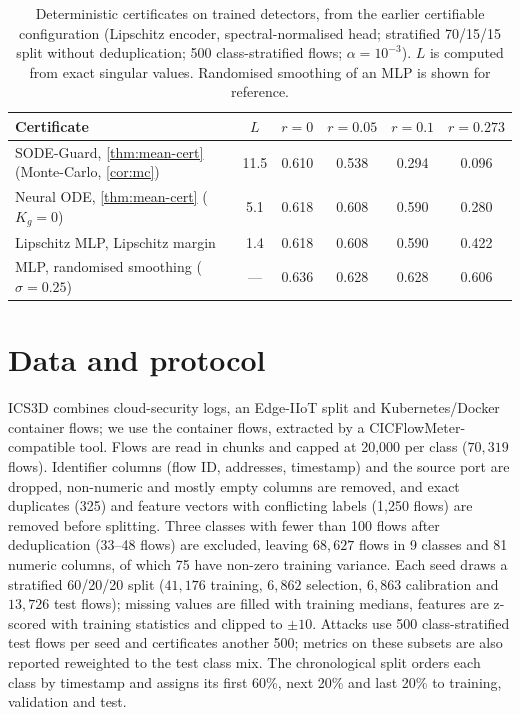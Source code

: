 \begin{table}[t]
\caption{Deterministic certificates on trained detectors, from the earlier
certifiable configuration (Lipschitz encoder, spectral-normalised head;
stratified 70/15/15 split without deduplication; 500 class-stratified flows;
$\alpha=10^{-3}$). $L$ is computed from exact singular values. Randomised
smoothing of an MLP is shown for reference.}
\label{tab:det-cert}
\centering\small
\begin{tabular}{lccccc}
\toprule
Certificate & $L$ & $r=0$ & $r=0.05$ & $r=0.1$ & $r=0.273$\\
\midrule
SODE-Guard, \cref{thm:mean-cert} (Monte-Carlo, \cref{cor:mc}) & 11.5 & 0.610 & 0.538 & 0.294 & 0.096\\
Neural ODE, \cref{thm:mean-cert} ($K_g=0$) & 5.1 & 0.618 & 0.608 & 0.590 & 0.280\\
Lipschitz MLP, Lipschitz margin & 1.4 & 0.618 & 0.608 & 0.590 & 0.422\\
MLP, randomised smoothing ($\sigma=0.25$) & --- & 0.636 & 0.628 & 0.628 & 0.606\\
\bottomrule
\end{tabular}
\end{table}

\section{Data and protocol}\label{app:data}
ICS3D \citep{anaedevha2025ics3d} combines cloud-security logs, an Edge-IIoT split and
Kubernetes/Docker container flows; we use the container flows, extracted by a
CICFlowMeter-compatible tool. Flows are read in chunks and capped at 20{,}000 per
class ($70{,}319$ flows). Identifier columns (flow ID, addresses, timestamp) and the
source port are dropped, non-numeric and mostly empty columns are removed, and
exact duplicates (325) and feature vectors with conflicting labels (1{,}250
flows) are removed before splitting. Three classes with fewer than 100 flows
after deduplication (33--48 flows) are excluded, leaving $68{,}627$ flows in 9
classes and 81 numeric columns, of which 75 have non-zero training variance.
Each seed draws a stratified 60/20/20 split ($41{,}176$ training,
$6{,}862$ selection, $6{,}863$ calibration and $13{,}726$ test flows); missing
values are filled with training medians, features are z-scored with training
statistics and clipped to $\pm10$. Attacks use 500 class-stratified test flows per
seed and certificates another 500; metrics on these subsets are also reported
reweighted to the test class mix. The chronological split orders each class by
timestamp and assigns its first 60\%, next 20\% and last 20\% to training,
validation and test.

